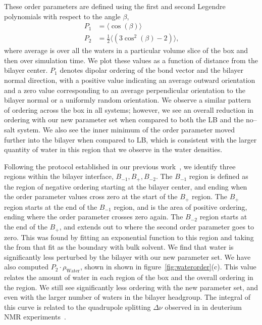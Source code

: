 \documentclass[12pt,openany,final]{book}
\begin{document}
These order parameters are defined using the first and second 
Legendre polynomials with respect to the angle $\beta$,
\begin{equation}
    \begin{split}
    P_1&=\langle \cos\left(\beta\right) \rangle
    \\ P_2&=\frac{1}{2}\bigg\langle\left(3\cos^2\left(\beta\right)-2\right)\bigg\rangle
    \text{,} 
\end{split}
\end{equation}
where average is over all the waters in a particular volume slice of the box 
and then over simulation time.  
We plot these values as a function of distance from the bilayer center. 
$P_1$ denotes dipolar ordering of the bond vector and the bilayer normal direction, 
with a positive value indicating an average outward orientation 
and a zero value corresponding to an average perpendicular orientation to the
bilayer normal or a uniformly random orientation. 
We observe a similar pattern of ordering across the box in all systems; 
however, we see an overall reduction in ordering with our new parameter set when
compared to both the LB and the no--salt system. 
We also see the inner minimum of the order parameter moved further into the bilayer
when compared to LB, 
which is consistent with the larger quantity of water 
in this region that we observe in the water densities.

Following the protocol established in our previous work~\cite{saunders:2019}, 
we identify three regions within the bilayer interface, $B_{-1}, B_{+}, B_{-2}$. 
The $B_{-1}$ region is defined as the region of negative ordering starting at the bilayer center, and ending 
    when the order parameter values cross zero at the start of the $B_{+}$ 
    region. The $B_{+}$ region starts at the end of the $B_{-1}$ region, and 
    is the area of positive ordering, ending where the order parameter crosses
    zero again. The $B_{-2}$ region starts at the end of the $B_{+}$, and extends out to where the 
    second order parameter goes to zero. This was found by fitting an exponential function to this region 
    and taking the  from that fit as the boundary with bulk solvent.
We find that water is significantly less perturbed by the bilayer with our new parameter set.  
We have also computed $P_2\cdot\rho_{\text{Water}}$, shown in shown in figure~\ref{fig:waterorder}(c). 
This value relates the amount of water in each region of the box and 
the overall ordering in the region. 
We still see significantly less ordering with the new parameter set, 
and even with the larger number of waters in the bilayer headgroup. 
The integral of this curve is related to the quadrupole splitting $\Delta \nu$ observed in
in deuterium NMR experiments~\cite{aaman:2003,kruczek:2017}.
\end{document}
